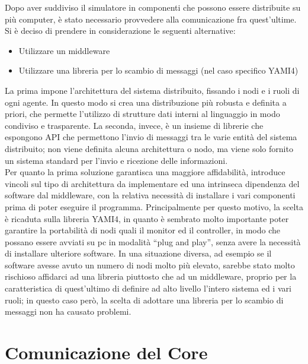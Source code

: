 Dopo aver suddiviso il simulatore in componenti che possono essere distribuite su più computer, è stato necessario provvedere alla comunicazione fra quest'ultime.
Si è deciso di prendere in considerazione le seguenti alternative:
\begin{itemize}
\item Utilizzare un middleware
\item Utilizzare una libreria per lo scambio di messaggi (nel caso specifico YAMI4)
\end{itemize}
La prima impone l’architettura del sistema distribuito, fissando i nodi e i ruoli di ogni agente. In questo modo si crea una distribuzione più robusta e definita a priori, che permette l’utilizzo di strutture dati interni al linguaggio in modo condiviso e trasparente.
La seconda, invece, è un insieme di librerie che espongono API che permettono l’invio di messaggi tra le varie entità del sistema distribuito; non viene definita alcuna architettura o nodo, ma viene solo fornito un sistema standard per l’invio e ricezione delle informazioni. \\
Per quanto la prima soluzione garantisca una maggiore affidabilità, introduce vincoli sul tipo di architettura da implementare ed una intrinseca dipendenza del software dal middleware, con la relativa necessità di installare i vari componenti prima di poter eseguire il programma.
Principalmente per questo motivo, la scelta è ricaduta sulla libreria YAMI4, in quanto è sembrato molto importante poter garantire la portabilità di nodi quali il monitor ed il controller, in modo che possano essere avviati su pc in modalità “plug and play”, senza avere la necessità di installare ulteriore software.
In una situazione diversa, ad esempio se il software avesse avuto un numero di nodi molto più elevato, sarebbe stato molto rischioso affidarci ad una libreria piuttosto che ad un middleware, proprio per la caratteristica di quest’ultimo di definire ad alto livello l’intero sistema ed i vari ruoli; in questo caso però, la scelta di adottare una libreria per lo scambio di messaggi non ha causato problemi. %


\section{Comunicazione del Core}

